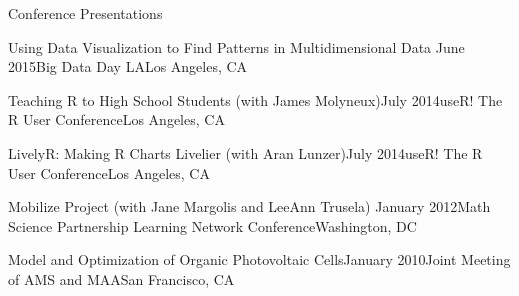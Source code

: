 \documentclass{resume} %
\begin{document}
\begin{rSection}{Conference Presentations}
\begin{sSubsection}{Using Data Visualization to Find Patterns in Multidimensional Data}{ }{June 2015}{Big Data Day LA}{Los Angeles, CA}
\end{sSubsection}


\begin{sSubsection}{Teaching R to High School Students}{ (with James Molyneux)}{July 2014}{useR! The R User Conference}{Los Angeles, CA}
\end{sSubsection}

\begin{sSubsection}{LivelyR: Making R Charts Livelier}{ (with Aran Lunzer)}{July 2014}{useR! The R User Conference}{Los Angeles, CA}
\end{sSubsection}

\begin{sSubsection}{Mobilize Project}{ (with Jane Margolis and LeeAnn Trusela)} {January 2012}{Math Science Partnership Learning Network Conference}{Washington, DC}
\end{sSubsection}

\begin{sSubsection}{Model and Optimization of Organic Photovoltaic Cells}{}{January 2010}{Joint Meeting of AMS and MAA}{San Francisco, CA}
\end{sSubsection}
\end{rSection}
\end{document}
